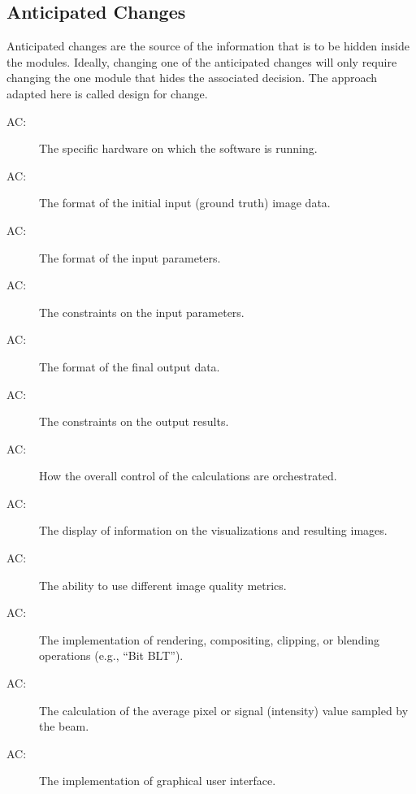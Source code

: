 \documentclass[12pt, titlepage]{article}
\newcounter{acnum}
\newcommand{\actheacnum}{AC\theacnum}
\begin{document}
\subsection{Anticipated Changes} \label{SecAchange}

Anticipated changes are the source of the information that is to be hidden
inside the modules. Ideally, changing one of the anticipated changes will only
require changing the one module that hides the associated decision. The approach
adapted here is called design for
change.

\begin{description}
  \item[ \actheacnum \label{AC_hardware}:] The specific
    hardware on which the software is running.
  \item[ \actheacnum \label{AC_inImage}:] The format of the
    initial input (ground truth) image data.
  \item[ \actheacnum \label{AC_inParamsFormat}:] The format of the input parameters.
  \item[ \actheacnum \label{AC_inParamsVerif}:] The constraints on the input parameters.
  \item[ \actheacnum \label{AC_outFormat}:] The format of the final output data.
  \item[ \actheacnum \label{AC_outVerif}:] The constraints on the output results.
  \item[ \actheacnum \label{AC_calc}:] How the overall control of the
    calculations are orchestrated.
  \item[ \actheacnum \label{AC_dispInfo}:] The display of information on
    the visualizations and resulting images.
  \item[ \actheacnum \label{AC_imgMetricAlgos}:] The ability
    to use different image quality metrics.
  \item[ \actheacnum \label{AC_maskOpts}:] The implementation of rendering,
    compositing, clipping, or blending operations (e.g., ``Bit BLT'').
  \item[ \actheacnum \label{AC_calcSignal}:] The calculation of the
    average pixel or signal (intensity) value sampled by the beam.
  \item[ \actheacnum \label{AC_GUI}:] The implementation of graphical user
    interface.
\end{description}
\end{document}

